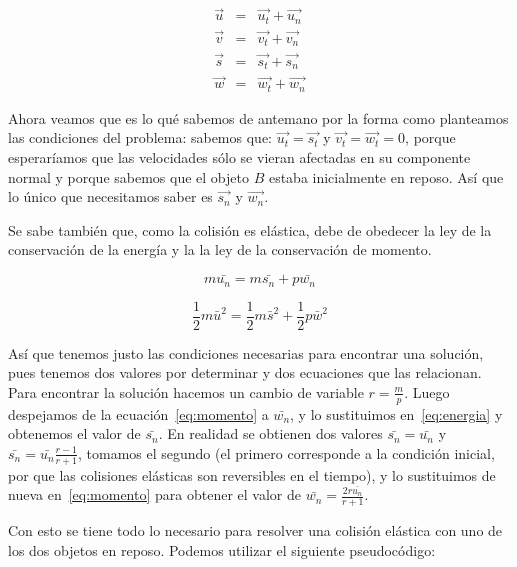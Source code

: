 \begin{eqnarray}
 \vec{u} & = & \vec{u_t} + \vec{u_n} \nonumber \\
 \vec{v} & = & \vec{v_t} + \vec{v_n} \nonumber \\
 \vec{s} & = & \vec{s_t} + \vec{s_n} \nonumber \\
 \vec{w} & = & \vec{w_t} + \vec{w_n} \nonumber
\end{eqnarray}

Ahora veamos que es lo qué sabemos de antemano por la forma como planteamos las condiciones del problema: sabemos que: $\vec{u_t} = \vec{s_t}$ y $\vec{v_t} = \vec{w_t} = 0$, porque esperaríamos que las velocidades sólo se vieran afectadas en su componente normal y porque sabemos que el objeto $B$ estaba inicialmente en reposo. Así que lo único que necesitamos saber es $\vec{s_n}$ y $\vec{w_n}$.

Se sabe también que, como la colisión es elástica, debe de obedecer la ley de la conservación de la energía y la la ley de la conservación de momento.

\begin{equation}
m \bar{u_n} = m \bar{s_n} + p \bar{w_n}
\label{eq:momento}
\end{equation}

\begin{equation}
\frac{1}{2} m \bar{u}^2 = \frac{1}{2} m \bar{s}^2 + \frac{1}{2} p \bar{w}^2
\label{eq:energia}
\end{equation}

Así que tenemos justo las condiciones necesarias para encontrar una solución, pues tenemos dos valores por determinar y dos ecuaciones que las relacionan. Para encontrar la solución hacemos un cambio de variable $r = \frac{m}{p}$. Luego despejamos de la ecuación~\ref{eq:momento} a $\bar{w_n}$, y lo sustituimos en~\ref{eq:energia} y obtenemos el valor de $\bar{s_n}$. En realidad se obtienen dos valores $\bar{s_n} = \bar{u_n}$ y $\bar{s_n} = \bar{u_n} \frac{r-1}{r+1}$, tomamos el segundo (el primero corresponde a la condición inicial, por que las colisiones elásticas son reversibles en el tiempo), y lo sustituimos de nueva en~\ref{eq:momento} para obtener el valor de $\bar{w_n} = \frac{2 r \bar{u_n}}{r + 1}$.

Con esto se tiene todo lo necesario  para resolver una colisión elástica con uno de los dos objetos en reposo. Podemos utilizar el siguiente pseudocódigo:


